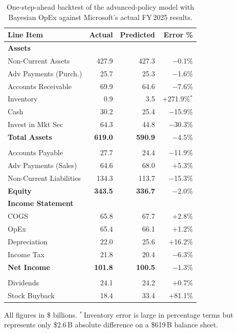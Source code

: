 \documentclass[12pt,a4paper]{article}
\begin{document}
\begin{table}[H]
\centering
\footnotesize

\begin{tabular}{l rrr}
\toprule
\textbf{Line Item} & \textbf{Actual} & \textbf{Predicted} & \textbf{Error \%} \\
\midrule
\multicolumn{4}{l}{\textbf{Assets}} \\
Non-Current Assets        & 427.9 & 427.3 & $-$0.1\% \\
Adv Payments (Purch.)     &  25.7 &  25.3 & $-$1.6\% \\
Accounts Receivable       &  69.9 &  64.6 & $-$7.6\% \\
Inventory                 &   0.9 &   3.5 & $+$271.9\%$^{*}$ \\
Cash                      &  30.2 &  25.4 & $-$15.9\% \\
Invest in Mkt Sec         &  64.3 &  44.8 & $-$30.3\% \\
\textbf{Total Assets}     & \textbf{619.0} & \textbf{590.9} & $-$4.5\% \\
\addlinespace
\multicolumn{4}{l}{\textbf{Liabilities}} \\
Accounts Payable          &  27.7 &  24.4 & $-$11.9\% \\
Adv Payments (Sales)      &  64.6 &  68.0 & $+$5.3\% \\
Non-Current Liabilities   & 134.3 & 113.7 & $-$15.3\% \\
\textbf{Equity}           & \textbf{343.5} & \textbf{336.7} & $-$2.0\% \\
\midrule
\multicolumn{4}{l}{\textbf{Income Statement}} \\
COGS                      &  65.8 &  67.7 & $+$2.8\% \\
OpEx                      &  65.4 &  66.1 & $+$1.2\% \\
Depreciation              &  22.0 &  25.6 & $+$16.2\% \\
Income Tax                &  21.8 &  20.4 & $-$6.3\% \\
\textbf{Net Income}       & \textbf{101.8} & \textbf{100.5} & $-$1.3\% \\
\addlinespace
\multicolumn{4}{l}{\textbf{Cash Flow}} \\
Dividends                 &  24.1 &  24.2 & $+$0.7\% \\
Stock Buyback             &  18.4 &  33.4 & $+$81.1\% \\
\bottomrule
\end{tabular}
\par\smallskip
{\scriptsize All figures in \$ billions.
$^{*}$\,Inventory error is large in percentage terms but represents only
\$2.6\,B absolute difference on a \$619\,B balance sheet.}
\caption{One-step-ahead backtest of the advanced-policy model with Bayesian OpEx
against Microsoft's actual FY\,2025 results.}
\label{tab:backtest_msft}
\end{table}
\end{document}
